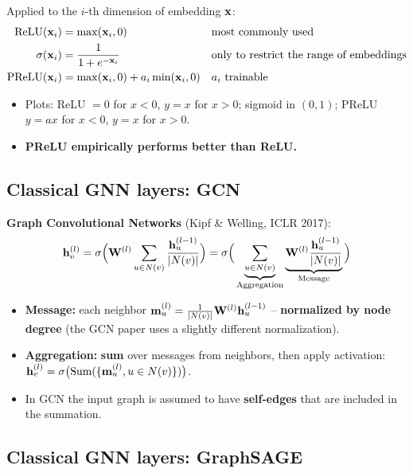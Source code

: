Applied to the $i$-th dimension of embedding $\mathbf{x}$:
\begin{align}
  \operatorname{ReLU}(\mathbf{x}_i) &= \max(\mathbf{x}_i, 0) && \text{most commonly used}\\
  \sigma(\mathbf{x}_i) &= \frac{1}{1+e^{-\mathbf{x}_i}} && \text{only to restrict the range of embeddings}\\
  \mathrm{PReLU}(\mathbf{x}_i) &= \max(\mathbf{x}_i,0) + a_i\min(\mathbf{x}_i,0) && \text{$a_i$ trainable}
\end{align}
\begin{itemize}
  \item Plots: ReLU $=0$ for $x<0$, $y=x$ for $x>0$; sigmoid in $(0,1)$;
    PReLU $y=ax$ for $x<0$, $y=x$ for $x>0$.
  \item \textbf{PReLU empirically performs better than ReLU.}
\end{itemize}

\subsection{Classical GNN layers: GCN}\label{sec:lec04-gcn}

\textbf{Graph Convolutional Networks} (Kipf \& Welling, ICLR 2017):
\begin{equation}\label{eq:lec04-gcn}
  \mathbf{h}_v^{(l)} = \sigma\Big(\mathbf{W}^{(l)}\sum_{u\in N(v)}\frac{\mathbf{h}_u^{(l-1)}}{|N(v)|}\Big)
  = \sigma\Big(\underbrace{\sum_{u\in N(v)}}_{\text{Aggregation}}
    \underbrace{\mathbf{W}^{(l)}\frac{\mathbf{h}_u^{(l-1)}}{|N(v)|}}_{\text{Message}}\Big)
\end{equation}
\begin{itemize}
  \item \textbf{Message:} each neighbor
    $\mathbf{m}_u^{(l)}=\frac{1}{|N(v)|}\mathbf{W}^{(l)}\mathbf{h}_u^{(l-1)}$ -- \textbf{normalized by
    node degree} (the GCN paper uses a slightly different normalization).
  \item \textbf{Aggregation:} \textbf{sum} over messages from neighbors, then
    apply activation:
    $\mathbf{h}_v^{(l)}=\sigma\big(\mathrm{Sum}(\{\mathbf{m}_u^{(l)}, u\in N(v)\})\big)$.
  \item In GCN the input graph is assumed to have \textbf{self-edges} that are
    included in the summation.
\end{itemize}

\subsection{Classical GNN layers: GraphSAGE}\label{sec:lec04-sage}

